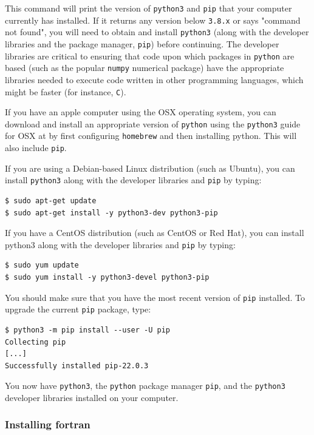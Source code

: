 This command will print the version of \texttt{python3} and \texttt{pip} that your computer currently has installed. If it returns any version below \texttt{3.8.x} or says "command not found", you will need to obtain and install \texttt{python3} (along with the developer libraries and the package manager, \texttt{pip}) before continuing. The developer libraries are critical to ensuring that code upon which packages in \texttt{python} are based (such as the popular \texttt{numpy} numerical package) have the appropriate libraries needed to execute code written in {other} programming languages, which might be faster (for instance, \texttt{C}). 

If you have an apple computer using the OSX operating system, you can download and install an appropriate version of \texttt{python} using the \texttt{python3} guide for OSX at \cite{pythonmac} by first configuring \texttt{homebrew} and then installing python. This will also include \texttt{pip}. 

If you are using a Debian-based Linux distribution (such as Ubuntu), you can install \texttt{python3} along with the developer libraries and \texttt{pip} by typing:

\begin{lstlisting}[style=bash]
$ sudo apt-get update
$ sudo apt-get install -y python3-dev python3-pip
\end{lstlisting}

If you have a CentOS distribution (such as CentOS or Red Hat), you can install python3 along with the developer libraries and \texttt{pip} by typing:

\begin{lstlisting}[style=bash]
$ sudo yum update
$ sudo yum install -y python3-devel python3-pip
\end{lstlisting}

You should make sure that you have the most recent version of \texttt{pip} installed. To upgrade the current \texttt{pip} package, type:

\begin{lstlisting}[style=bash]
$ python3 -m pip install --user -U pip
Collecting pip
[...]
Successfully installed pip-22.0.3
\end{lstlisting}

You now have \texttt{python3}, the \texttt{python} package manager \texttt{pip}, and the \texttt{python3} developer libraries installed on your computer. 

\subsubsection{Installing fortran}

